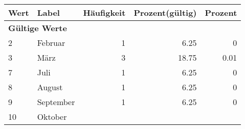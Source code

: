      \begin{longtable}{lXrrr}
     \toprule
     \textbf{Wert} & \textbf{Label} & \textbf{Häufigkeit} & \textbf{Prozent(gültig)} & \textbf{Prozent} \\
     \endhead
     \midrule
     \multicolumn{5}{l}{\textbf{Gültige Werte}}\\

     2 &
     \multicolumn{1}{X}{ Februar   } &


       \num{1} &
       \num[round-mode=places,round-precision=2]{6.25} &
         \num[round-mode=places,round-precision=2]{0} \\

     3 &
     \multicolumn{1}{X}{ März   } &


       \num{3} &
       \num[round-mode=places,round-precision=2]{18.75} &
         \num[round-mode=places,round-precision=2]{0.01} \\

     7 &
     \multicolumn{1}{X}{ Juli   } &


       \num{1} &
       \num[round-mode=places,round-precision=2]{6.25} &
         \num[round-mode=places,round-precision=2]{0} \\

     8 &
     \multicolumn{1}{X}{ August   } &


       \num{1} &
       \num[round-mode=places,round-precision=2]{6.25} &
         \num[round-mode=places,round-precision=2]{0} \\

     9 &
     \multicolumn{1}{X}{ September   } &


       \num{1} &
       \num[round-mode=places,round-precision=2]{6.25} &
         \num[round-mode=places,round-precision=2]{0} \\

     10 &
     \multicolumn{1}{X}{ Oktober   } &



\end{longtable}
